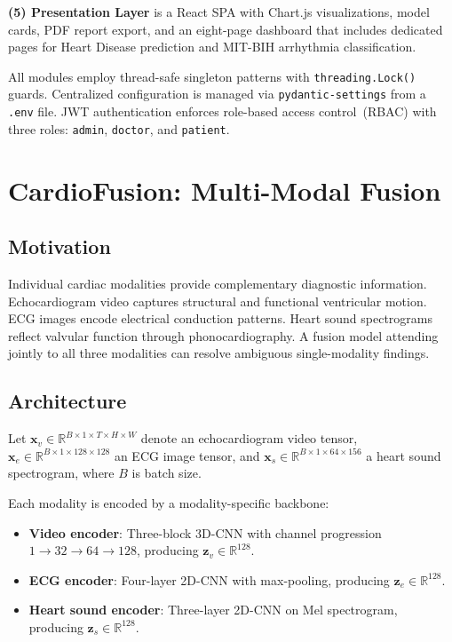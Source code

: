 \documentclass[journal,10pt,twoside]{IEEEtran}
\newcommand{\RR}{\mathbb{R}}
\newcommand{\myvec}[1]{\mathbf{#1}}
\begin{document}
\textbf{(5) Presentation Layer} is a React SPA with Chart.js visualizations, model
cards, PDF report export, and an eight-page dashboard that includes dedicated
pages for Heart Disease prediction and MIT-BIH arrhythmia classification.

All modules employ thread-safe singleton patterns with \texttt{threading.Lock()} guards.
Centralized configuration is managed via \texttt{pydantic-settings} from a
\texttt{.env} file.
JWT authentication enforces role-based access control~(RBAC) with three roles:
\texttt{admin}, \texttt{doctor}, and \texttt{patient}.

\section{CardioFusion: Multi-Modal Fusion}
\label{sec:cardiofusion}

\subsection{Motivation}

Individual cardiac modalities provide complementary diagnostic information.
Echocardiogram video captures structural and functional ventricular motion.
ECG images encode electrical conduction patterns.
Heart sound spectrograms reflect valvular function through phonocardiography.
A fusion model attending jointly to all three modalities can resolve ambiguous
single-modality findings.

\subsection{Architecture}

Let $\myvec{x}_v \in \RR^{B \times 1 \times T \times H \times W}$ denote an
echocardiogram video tensor, $\myvec{x}_e \in \RR^{B \times 1 \times 128 \times 128}$
an ECG image tensor, and $\myvec{x}_s \in \RR^{B \times 1 \times 64 \times 156}$ a
heart sound spectrogram, where $B$ is batch size.

Each modality is encoded by a modality-specific backbone:
\begin{itemize}
  \item \textbf{Video encoder}: Three-block 3D-CNN with channel progression
        $1{\to}32{\to}64{\to}128$, producing $\myvec{z}_v \in \RR^{128}$.
  \item \textbf{ECG encoder}: Four-layer 2D-CNN with max-pooling, producing
        $\myvec{z}_e \in \RR^{128}$.
  \item \textbf{Heart sound encoder}: Three-layer 2D-CNN on Mel spectrogram,
        producing $\myvec{z}_s \in \RR^{128}$.
\end{itemize}
\end{document}
